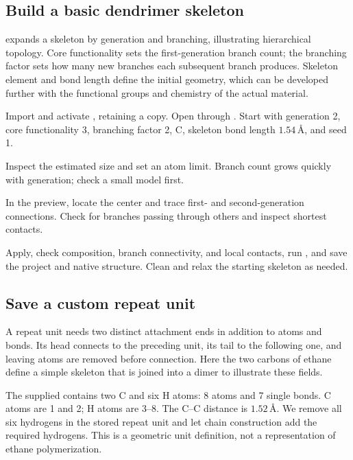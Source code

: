 \subsection{Build a basic dendrimer skeleton}\label{sec:dendrimer-reference}

 expands a skeleton by generation and branching, illustrating hierarchical topology. Core functionality sets the first-generation branch count; the branching factor sets how many new branches each subsequent branch produces. Skeleton element and bond length define the initial geometry, which can be developed further with the functional groups and chemistry of the actual material.

\begin{steps}
  \item Import and activate , retaining a copy. Open  through . Start with generation 2, core functionality 3, branching factor 2, C, skeleton bond length $1.54\,\text{\AA}$, and seed 1.
  \item Inspect the estimated size and set an atom limit. Branch count grows quickly with generation; check a small model first.
  \item In the preview, locate the center and trace first- and second-generation connections. Check for branches passing through others and inspect shortest contacts.
  \item Apply, check composition, branch connectivity, and local contacts, run , and save the project and native structure. Clean and relax the starting skeleton as needed.
\end{steps}

\subsection{Save a custom repeat unit}\label{sec:repeat-unit-reference}

A repeat unit needs two distinct attachment ends in addition to atoms and bonds. Its head connects to the preceding unit, its tail to the following one, and leaving atoms are removed before connection. Here the two carbons of ethane define a simple skeleton that is joined into a dimer to illustrate these fields.

The supplied  contains two C and six H atoms: 8 atoms and 7 single bonds. C atoms are 1 and 2; H atoms are 3--8. The C--C distance is $1.52\,\text{\AA}$. We remove all six hydrogens in the stored repeat unit and let chain construction add the required hydrogens. This is a geometric unit definition, not a representation of ethane polymerization.

